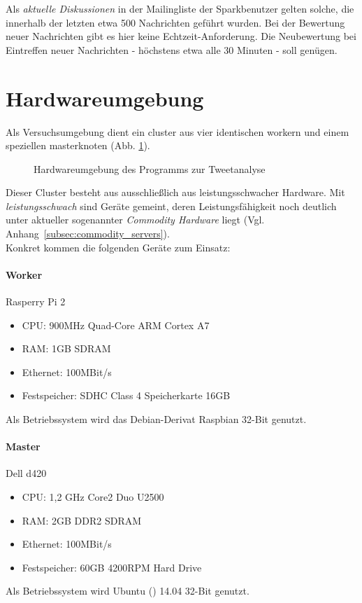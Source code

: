 Als \textit{aktuelle Diskussionen} in der Mailingliste der Sparkbenutzer gelten solche, die innerhalb der letzten etwa 500 Nachrichten geführt wurden. Bei der Bewertung neuer Nachrichten gibt es hier keine Echtzeit-Anforderung. Die Neubewertung bei Eintreffen neuer Nachrichten - höchstens etwa alle 30 Minuten - soll genügen.

\section{Hardwareumgebung}

Als Versuchsumgebung dient ein \gls{cluster} aus vier identischen \gls{worker}n und einem speziellen \gls{master}knoten (Abb. \ref{figure:versuchsaufbau}).

\begin{figure}[h]
	\centering
  
	\caption{Hardwareumgebung des Programms zur Tweetanalyse}
	\label{figure:versuchsaufbau}
\end{figure}

Dieser Cluster besteht aus ausschließlich aus leistungsschwacher Hardware. Mit \textit{leistungsschwach} sind Geräte gemeint, deren Leistungsfähigkeit noch deutlich unter aktueller sogenannter \textit{Commodity Hardware} liegt (Vgl. Anhang~\ref{subsec:commodity_servers}).\\

Konkret kommen die folgenden Geräte zum Einsatz:

\paragraph{Worker}
Rasperry Pi 2
\begin{itemize}
	\item CPU: 900MHz Quad-Core ARM Cortex A7
	\item RAM: 1GB SDRAM
	\item Ethernet: 100MBit/s
	\item Festspeicher: SDHC Class 4 Speicherkarte 16GB
\end{itemize}
Als Betriebssystem wird das Debian-Derivat Raspbian\cite{raspbian} 32-Bit genutzt.

\paragraph{Master}
Dell d420
\begin{itemize}
	\item CPU: 1,2 GHz Core2 Duo U2500
	\item RAM: 2GB DDR2 SDRAM
	\item Ethernet: 100MBit/s
	\item Festspeicher: 60GB 4200RPM Hard Drive
\end{itemize}
Als Betriebssystem wird Ubuntu (\cite{ubuntu}) 14.04 32-Bit genutzt.

